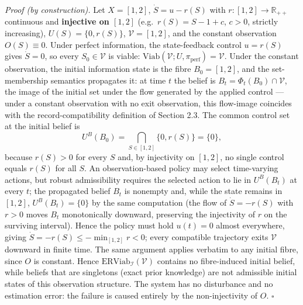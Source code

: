 \documentclass[11pt]{article}
\theoremstyle{definition}
\begin{document}
\emph{Proof (by construction).} Let \(X = [1,2]\), \(\dot S = u - r(S)\)
with \(r : [1,2] \to \mathbb{R}_{++}\) continuous and \textbf{injective
on \([1,2]\)} (e.g.~\(r(S) = S - 1 + c\), \(c > 0\), strictly
increasing), \(U(S) = \{0, r(S)\}\), \(\mathcal{V} = [1,2]\), and the
constant observation \(O(S) \equiv 0\). Under perfect information, the
state-feedback control \(u = r(S)\) gives \(\dot S = 0\), so every
\(S_0 \in \mathcal{V}\) is viable:
\(\mathrm{Viab}(\mathcal{V}; U, \pi_{\mathrm{perf}}) = \mathcal{V}\).
Under the constant observation, the initial information state is the
fibre \(B_0 = [1,2]\), and the set-membership semantics propagates it:
at time \(t\) the belief is \(B_t = \Phi_t(B_0) \cap \mathcal{V}\), the
image of the initial set under the flow generated by the applied control
--- under a constant observation with no exit observation, this
flow-image coincides with the record-compatibility definition of Section
2.3. The common control set at the initial belief is
\[U^B(B_0) = \bigcap_{S \in [1,2]} \{0, r(S)\} = \{0\},\] because
\(r(S) > 0\) for every \(S\) and, by injectivity on \([1,2]\), no single
control equals \(r(S)\) for all \(S\). An observation-based policy may
select time-varying actions, but robust admissibility requires the
selected action to lie in \(U^B(B_t)\) at every \(t\); the propagated
belief \(B_t\) is nonempty and, while the state remains in \([1,2]\),
\(U^B(B_t) = \{0\}\) by the same computation (the flow of
\(\dot S = -r(S)\) with \(r > 0\) moves \(B_t\) monotonically downward,
preserving the injectivity of \(r\) on the surviving interval). Hence
the policy must hold \(u(t) = 0\) almost everywhere, giving
\(\dot S = -r(S) \le -\min_{[1,2]} r < 0\); every compatible trajectory
exits \(\mathcal{V}\) downward in finite time. The same argument applies
verbatim to any initial fibre, since \(O\) is constant. Hence
\(\mathrm{ERViab}_{\mathcal{I}}(\mathcal{V})\) contains no fibre-induced
initial belief, while beliefs that are singletons (exact prior
knowledge) are not admissible initial states of this observation
structure. The system has no disturbance and no estimation error: the
failure is caused entirely by the non-injectivity of \(O\). \ensuremath{\square}
\end{document}
